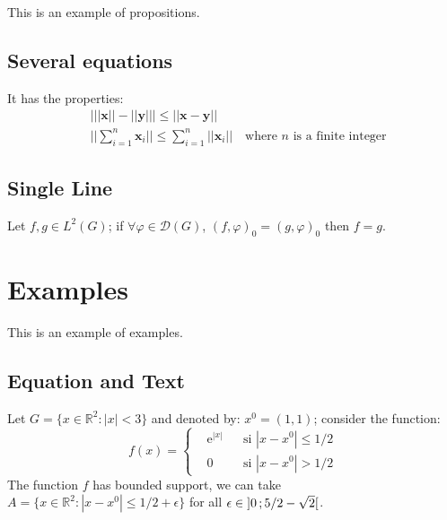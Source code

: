 \documentclass[11pt,fleqn]{book} %
\begin{document}
This is an example of propositions.

\subsection{Several equations}

\begin{proposition}
It has the properties:
\begin{align}
& \big| ||\mathbf{x}|| - ||\mathbf{y}|| \big|\leq || \mathbf{x}- \mathbf{y}||\\
&  ||\sum_{i=1}^n\mathbf{x}_i||\leq \sum_{i=1}^n||\mathbf{x}_i||\quad\text{where $n$ is a finite integer}
\end{align}
\end{proposition}

\subsection{Single Line}

\begin{proposition} 
Let $f,g\in L^2(G)$; if $\forall \varphi\in\mathcal{D}(G)$, $(f,\varphi)_0=(g,\varphi)_0$ then $f = g$. 
\end{proposition}


\section{Examples}

This is an example of examples.

\subsection{Equation and Text}

\begin{example}
Let $G=\{x\in\mathbb{R}^2:|x|<3\}$ and denoted by: $x^0=(1,1)$; consider the function:
\begin{equation}
f(x)=\left\{\begin{aligned} & \mathrm{e}^{|x|} & & \text{si $|x-x^0|\leq 1/2$}\\
& 0 & & \text{si $|x-x^0|> 1/2$}\end{aligned}\right.
\end{equation}
The function $f$ has bounded support, we can take $A=\{x\in\mathbb{R}^2:|x-x^0|\leq 1/2+\epsilon\}$ for all $\epsilon\in\mathopen{]}0\,;5/2-\sqrt{2}\mathclose{[}$.
\end{example}
\end{document}

